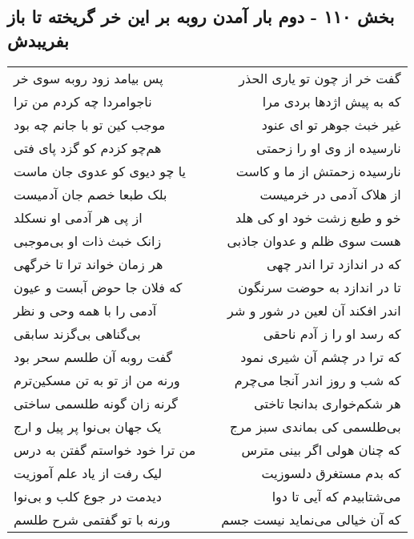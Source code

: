 \begin{center}
\section*{بخش ۱۱۰ - دوم بار آمدن روبه بر این خر گریخته تا باز بفریبدش}
\label{sec:sh110}
\begin{longtable}{l p{0.5cm} r}
پس بیامد زود روبه سوی خر
&&
گفت خر از چون تو یاری الحذر
\\
ناجوامردا چه کردم من ترا
&&
که به پیش اژدها بردی مرا
\\
موجب کین تو با جانم چه بود
&&
غیر خبث جوهر تو ای عنود
\\
هم‌چو کزدم کو گزد پای فتی
&&
نارسیده از وی او را زحمتی
\\
یا چو دیوی کو عدوی جان ماست
&&
نارسیده زحمتش از ما و کاست
\\
بلک طبعا خصم جان آدمیست
&&
از هلاک آدمی در خرمیست
\\
از پی هر آدمی او نسکلد
&&
خو و طبع زشت خود او کی هلد
\\
زانک خبث ذات او بی‌موجبی
&&
هست سوی ظلم و عدوان جاذبی
\\
هر زمان خواند ترا تا خرگهی
&&
که در اندازد ترا اندر چهی
\\
که فلان جا حوض آبست و عیون
&&
تا در اندازد به حوضت سرنگون
\\
آدمی را با همه وحی و نظر
&&
اندر افکند آن لعین در شور و شر
\\
بی‌گناهی بی‌گزند سابقی
&&
که رسد او را ز آدم ناحقی
\\
گفت روبه آن طلسم سحر بود
&&
که ترا در چشم آن شیری نمود
\\
ورنه من از تو به تن مسکین‌ترم
&&
که شب و روز اندر آنجا می‌چرم
\\
گرنه زان گونه طلسمی ساختی
&&
هر شکم‌خواری بدانجا تاختی
\\
یک جهان بی‌نوا پر پیل و ارج
&&
بی‌طلسمی کی بماندی سبز مرج
\\
من ترا خود خواستم گفتن به درس
&&
که چنان هولی اگر بینی مترس
\\
لیک رفت از یاد علم آموزیت
&&
که بدم مستغرق دلسوزیت
\\
دیدمت در جوع کلب و بی‌نوا
&&
می‌شتابیدم که آیی تا دوا
\\
ورنه با تو گفتمی شرح طلسم
&&
که آن خیالی می‌نماید نیست جسم
\\
\end{longtable}
\end{center}
